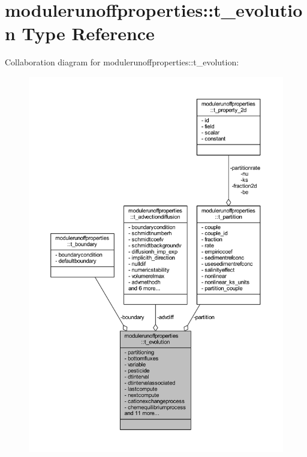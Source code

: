 \hypertarget{structmodulerunoffproperties_1_1t__evolution}{}\section{modulerunoffproperties\+:\+:t\+\_\+evolution Type Reference}
\label{structmodulerunoffproperties_1_1t__evolution}


Collaboration diagram for modulerunoffproperties\+:\+:t\+\_\+evolution\+:\nopagebreak
\begin{figure}[H]
\begin{center}
\leavevmode
\includegraphics[width=350pt]{structmodulerunoffproperties_1_1t__evolution__coll__graph}
\end{center}
\end{figure}
